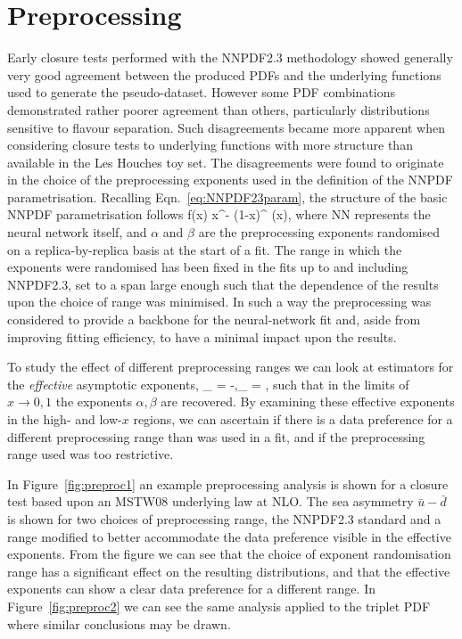 \section{Preprocessing}

Early closure tests performed with the NNPDF2.3 methodology showed generally very good agreement between the produced PDFs and the underlying functions used to generate the pseudo-dataset. However some PDF combinations demonstrated rather poorer agreement than others, particularly distributions sensitive to flavour separation. Such disagreements became more apparent when considering closure tests to underlying functions with more structure than available in the Les Houches toy set. The disagreements were found to originate in the choice of the preprocessing exponents used in the definition of the NNPDF parametrisation. Recalling Eqn.~\ref{eq:NNPDF23param}, the structure of the basic NNPDF parametrisation follows
\be f(x) \propto x^{-\alpha} (1-x)^{\beta} (x),\ee
where NN represents the neural network itself, and $\alpha$ and $\beta$ are the preprocessing exponents randomised on a replica-by-replica basis at the start of a fit. The range in which the exponents were randomised has been fixed in the fits up to and including NNPDF2.3, set to a span large enough such that the dependence of the results upon the choice of range was minimised. In such a way the preprocessing was considered to provide a backbone for the neural-network fit and, aside from improving fitting efficiency, to have a minimal impact upon the results.

To study the effect of different preprocessing ranges we can look at estimators for the \emph{effective} asymptotic exponents,
\be \alpha_{} = -,\quad\quad \beta_{} = , \ee
such that in the limits of $x\to0,1$ the exponents $\alpha,\beta$ are recovered. By examining these effective exponents in the high- and low-$x$ regions, we can ascertain if there is a data preference for a different preprocessing range than was used in a fit, and if the preprocessing range used was too restrictive.

In Figure~\ref{fig:preproc1} an example preprocessing analysis is shown for a closure test based upon an MSTW08 underlying law at NLO. The sea asymmetry $\bar{u} -\bar{d}$ is shown for two choices of preprocessing range, the NNPDF2.3 standard and a range modified to better accommodate the data preference visible in the effective exponents. From the figure we can see that the choice of exponent randomisation range has a significant effect on the resulting distributions, and that the effective exponents can show a clear data preference for a different range. In Figure~\ref{fig:preproc2} we can see the same analysis applied to the triplet PDF where similar conclusions may be drawn.

